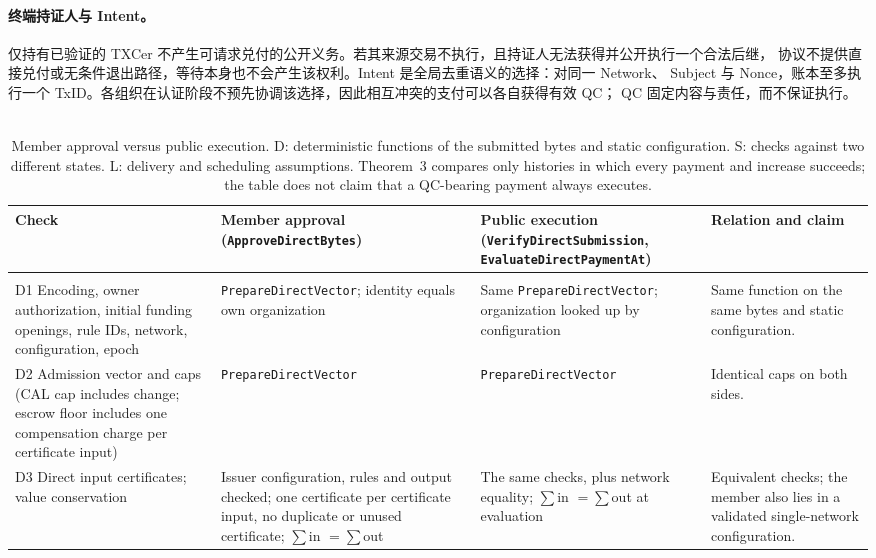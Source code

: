 \paragraph{终端持证人与 Intent。}
仅持有已验证的 TXCer 不产生可请求兑付的公开义务。若其来源交易不执行，且持证人无法获得并公开执行一个合法后继，
协议不提供直接兑付或无条件退出路径，等待本身也不会产生该权利。Intent 是全局去重语义的选择：对同一 Network、
Subject 与 Nonce，账本至多执行一个 TxID。各组织在认证阶段不预先协调该选择，因此相互冲突的支付可以各自获得有效 QC；
QC 固定内容与责任，而不保证执行。
 
\begin{table}[!t]
\caption{Member approval versus public execution. D: deterministic functions of the
submitted bytes and static configuration. S: checks against two different states.
L: delivery and scheduling assumptions. Theorem~3 compares only histories in which every
payment and increase succeeds; the table does not claim that a QC-bearing payment
always executes.}
\label{tab:sup-checks}
\footnotesize
\renewcommand{\arraystretch}{1.15}
\begin{tabularx}{\textwidth}{@{}>{\raggedright\arraybackslash}p{2.6cm}YYY@{}}
\hline
Check & Member approval (\texttt{ApproveDirectBytes}) & Public execution (\texttt{VerifyDirectSubmission}, \texttt{EvaluateDirectPaymentAt}) & Relation and claim \\
\hline
{} \\
D1 Encoding, owner authorization, initial funding openings, rule IDs, network, configuration, epoch
 & \texttt{PrepareDirectVector}; identity equals own organization
 & Same \texttt{PrepareDirectVector}; organization looked up by configuration
 & Same function on the same bytes and static configuration. \\
D2 Admission vector and caps (CAL cap includes change; escrow floor includes one compensation charge per certificate input)
 & \texttt{PrepareDirectVector}
 & \texttt{PrepareDirectVector}
 & Identical caps on both sides. \\
D3 Direct input certificates; value conservation
 & Issuer configuration, rules and output checked; one certificate per certificate input, no duplicate or unused certificate; $\sum$in $=\sum$out
 & The same checks, plus network equality; $\sum$in $=\sum$out at evaluation
 & Equivalent checks; the member also lies in a validated single-network configuration. \\

\end{tabularx}
\end{table}
